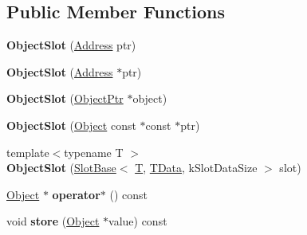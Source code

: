 \subsection*{Public Member Functions}
\begin{DoxyCompactItemize}
\item 
\mbox{\label{classv8_1_1internal_1_1ObjectSlot_adec37667fb7102502a6cbaf904ddd67e}} 
{\bfseries Object\+Slot} (\mbox{\hyperlink{classuintptr__t}{Address}} ptr)
\item 
\mbox{\label{classv8_1_1internal_1_1ObjectSlot_a06e5f3b311c209f0c06b34cb4389cc1d}} 
{\bfseries Object\+Slot} (\mbox{\hyperlink{classuintptr__t}{Address}} $\ast$ptr)
\item 
\mbox{\label{classv8_1_1internal_1_1ObjectSlot_a32e32523ded7095afc0ecbe57bb26739}} 
{\bfseries Object\+Slot} (\mbox{\hyperlink{classv8_1_1internal_1_1ObjectPtr}{Object\+Ptr}} $\ast$object)
\item 
\mbox{\label{classv8_1_1internal_1_1ObjectSlot_aaa8d7065921b5412986da7d9f6c1a5a0}} 
{\bfseries Object\+Slot} (\mbox{\hyperlink{classv8_1_1internal_1_1Object}{Object}} const $\ast$const $\ast$ptr)
\item 
\mbox{\label{classv8_1_1internal_1_1ObjectSlot_ada1742534cbb63c2dc1d34d3d244fcd2}} 
{\footnotesize template$<$typename T $>$ }\\{\bfseries Object\+Slot} (\mbox{\hyperlink{classv8_1_1internal_1_1SlotBase}{Slot\+Base}}$<$ \mbox{\hyperlink{classv8_1_1internal_1_1torque_1_1T}{T}}, \mbox{\hyperlink{classuintptr__t}{T\+Data}}, k\+Slot\+Data\+Size $>$ slot)
\item 
\mbox{\label{classv8_1_1internal_1_1ObjectSlot_a8903a2b3dd6582095fa0fd853ffa4b16}} 
\mbox{\hyperlink{classv8_1_1internal_1_1Object}{Object}} $\ast$ {\bfseries operator$\ast$} () const
\item 
\mbox{\label{classv8_1_1internal_1_1ObjectSlot_ae4dfb5a40819a35291b54e1017d24c3c}} 
void {\bfseries store} (\mbox{\hyperlink{classv8_1_1internal_1_1Object}{Object}} $\ast$value) const

\end{DoxyCompactItemize}
